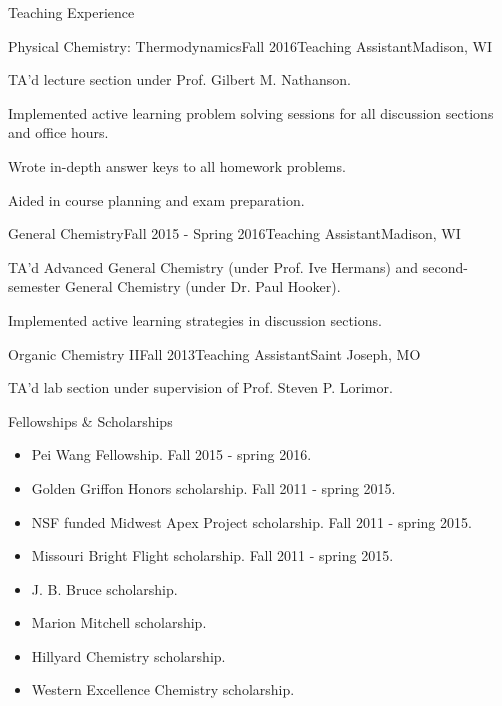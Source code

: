 \documentclass{resume} %
\begin{document}
\pagebreak

\begin{rSection}{Teaching Experience}
	
\begin{rSubsection}{Physical Chemistry: Thermodynamics}{Fall 2016}{Teaching Assistant}{Madison, WI}
	\item TA'd lecture section under Prof. Gilbert M. Nathanson.
	\item Implemented active learning problem solving sessions for all discussion sections and office hours.
	\item Wrote in-depth answer keys to all homework problems.
	\item Aided in course planning and exam preparation.
\end{rSubsection}

\begin{rSubsection}{General Chemistry}{Fall 2015 - Spring 2016}{Teaching Assistant}{Madison, WI}
	\item TA'd Advanced General Chemistry (under Prof. Ive Hermans) and second-semester General Chemistry (under Dr. Paul Hooker).
	\item Implemented active learning strategies in discussion sections.
\end{rSubsection}

\begin{rSubsection}{Organic Chemistry II}{Fall 2013}{Teaching Assistant}{Saint Joseph, MO}
	\item TA'd lab section under supervision of Prof. Steven P. Lorimor.
\end{rSubsection}

\end{rSection}


\begin{rSection}{Fellowships \& Scholarships}
	
\begin{itemize}[leftmargin = 0 pt]
	\item Pei Wang Fellowship. Fall 2015 - spring 2016.
	\item Golden Griffon Honors scholarship. Fall 2011 - spring 2015.
	\item NSF funded Midwest Apex Project scholarship. Fall 2011 - spring 2015.
	\item Missouri Bright Flight scholarship. Fall 2011 - spring 2015.
	\item J. B. Bruce scholarship.
	\item Marion Mitchell scholarship.
	\item Hillyard Chemistry scholarship.
	\item Western Excellence Chemistry scholarship.
\end{itemize}
	
\end{rSection}
\end{document}

